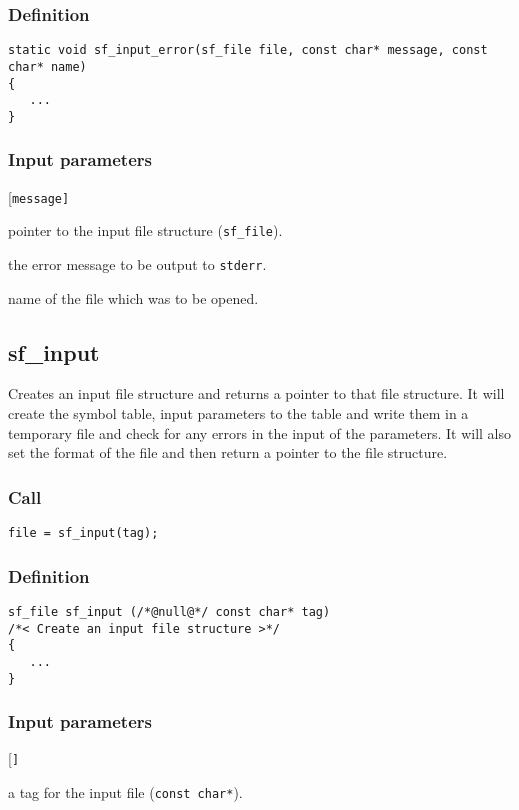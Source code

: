 \subsubsection*{Definition}
\begin{verbatim}
static void sf_input_error(sf_file file, const char* message, const char* name)
{
   ...
}
\end{verbatim}

\subsubsection*{Input parameters}
\begin{desclist}{\tt }{\quad}[\tt message]
   \setlength\itemsep{0pt}
   \item[file]    pointer to the input file structure (\texttt{sf\_file}). 
   \item[message] the error message to be output to \texttt{stderr}. 
   \item[name]    name of the file which was to be opened.    
\end{desclist}




\subsection{{sf\_input}}\label{sec:sf_input}
Creates an input file structure and returns a pointer to that file structure. It will create the symbol table, input parameters to the table and write them in a temporary file and check for any errors in the input of the parameters. It will also set the format of the file and then return a pointer to the file structure.

\subsubsection*{Call}
\begin{verbatim}file = sf_input(tag);\end{verbatim}

\subsubsection*{Definition}
\begin{verbatim}
sf_file sf_input (/*@null@*/ const char* tag)
/*< Create an input file structure >*/
{
   ...
}
\end{verbatim}

\subsubsection*{Input parameters}
\begin{desclist}{\tt }{\quad}[\tt ]
   \setlength\itemsep{0pt}
   \item[tag] a tag for the input file (\texttt{const char*}).  
\end{desclist}

